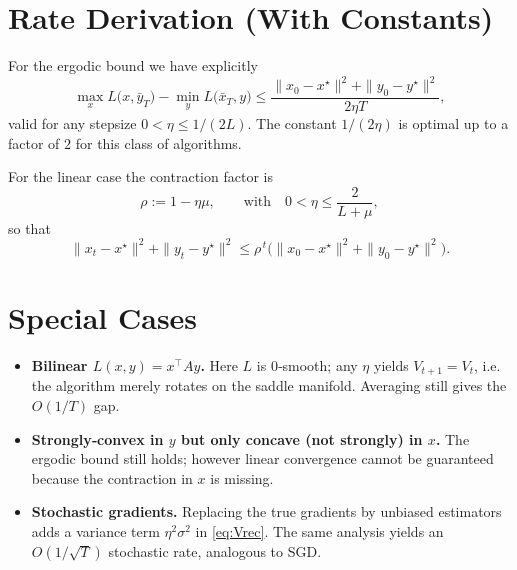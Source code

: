 \documentclass{article}
\begin{document}
\section*{Rate Derivation (With Constants)}
For the ergodic bound we have explicitly
\[
\boxed{
\max_{x}L\bigl(x,\bar y_{T}\bigr)-\min_{y}L\bigl(\bar x_{T},y\bigr)
\le \frac{\|x_{0}-x^{\star}\|^{2}+\|y_{0}-y^{\star}\|^{2}}{2\eta T},
}
\]
valid for any stepsize $0<\eta\le1/(2L)$.  The constant $1/(2\eta)$ is optimal up to a factor of $2$ for this class of algorithms.

For the linear case the contraction factor is
\[
\rho:=1-\eta\mu,\qquad\text{with}\quad
0<\eta\le\frac{2}{L+\mu},
\]
so that
\[
\|x_{t}-x^{\star}\|^{2}+\|y_{t}-y^{\star}\|^{2}\le\rho^{\,t}
\bigl(\|x_{0}-x^{\star}\|^{2}+\|y_{0}-y^{\star}\|^{2}\bigr).
\]

\section*{Special Cases}
\begin{itemize}
    \item \textbf{Bilinear $L(x,y)=x^{\top}Ay$.}  Here $L$ is $0$‑smooth; any $\eta$ yields $V_{t+1}=V_{t}$, i.e. the algorithm merely rotates on the saddle manifold.  Averaging still gives the $O(1/T)$ gap.
    \item \textbf{Strongly‑convex in $y$ but only concave (not strongly) in $x$.}  The ergodic bound still holds; however linear convergence cannot be guaranteed because the contraction in $x$ is missing.
    \item \textbf{Stochastic gradients.}  Replacing the true gradients by unbiased estimators adds a variance term $\eta^{2}\sigma^{2}$ in \eqref{eq:Vrec}.  The same analysis yields an $O(1/\sqrt{T})$ stochastic rate, analogous to SGD.
\end{itemize}
\end{document}
